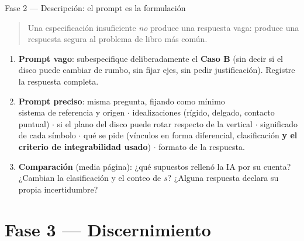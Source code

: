 \documentclass[10pt,aspectratio=169]{beamer}
\begin{document}
\begin{frame}{Fase 2 --- Descripción: el prompt es la formulación}
  \begin{quote}\small
    Una especificación insuficiente \emph{no} produce una respuesta vaga: produce una respuesta segura al problema de libro más común.
  \end{quote}
  \pause
  \begin{enumerate}
    \item \textbf{Prompt vago}: subespecifique deliberadamente el \textbf{Caso B} (sin decir si el disco puede cambiar de rumbo, sin fijar ejes, sin pedir justificación). Registre la respuesta completa.
    \pause
    \item \textbf{Prompt preciso}: misma pregunta, fijando como mínimo\\
      sistema de referencia y origen $\cdot$ idealizaciones (rígido, delgado, contacto puntual) $\cdot$ si el plano del disco puede rotar respecto de la vertical $\cdot$ significado de cada símbolo $\cdot$ qué se pide (vínculos en forma diferencial, clasificación \textbf{y el criterio de integrabilidad usado}) $\cdot$ formato de la respuesta.
    \pause
    \item \textbf{Comparación} (media página): ¿qué supuestos rellenó la IA por su cuenta? ¿Cambian la clasificación y el conteo de $s$? ¿Alguna respuesta declara su propia incertidumbre?
  \end{enumerate}
\end{frame}

\section{Fase 3 --- Discernimiento}
\end{document}
